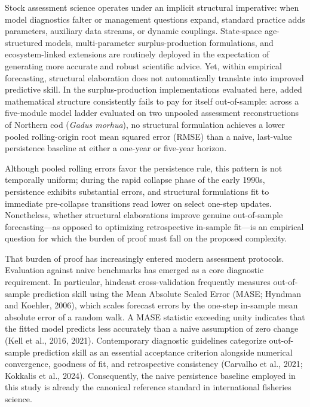 \documentclass[11pt]{article}
\begin{document}
Stock assessment science operates under an implicit structural
imperative: when model diagnostics falter or management questions
expand, standard practice adds parameters, auxiliary data streams, or
dynamic couplings. State-space age-structured models, multi-parameter
surplus-production formulations, and ecosystem-linked extensions are
routinely deployed in the expectation of generating more accurate and
robust scientific advice. Yet, within empirical forecasting, structural
elaboration does not automatically translate into improved predictive
skill. In the surplus-production implementations evaluated here, added
mathematical structure consistently fails to pay for itself
out-of-sample: across a five-module model ladder evaluated on two
unpooled assessment reconstructions of Northern cod (\emph{Gadus
morhua}), no structural formulation achieves a lower pooled
rolling-origin root mean squared error (RMSE) than a naive, last-value
persistence baseline at either a one-year or five-year horizon.

Although pooled rolling errors favor the persistence rule, this pattern
is not temporally uniform; during the rapid collapse phase of the early
1990s, persistence exhibits substantial errors, and structural
formulations fit to immediate pre-collapse transitions read lower on
select one-step updates. Nonetheless, whether structural elaborations
improve genuine out-of-sample forecasting---as opposed to optimizing
retrospective in-sample fit---is an empirical question for which the
burden of proof must fall on the proposed complexity.

That burden of proof has increasingly entered modern assessment
protocols. Evaluation against naive benchmarks has emerged as a core
diagnostic requirement. In particular, hindcast cross-validation
frequently measures out-of-sample prediction skill using the Mean
Absolute Scaled Error (MASE; Hyndman and Koehler, 2006), which scales
forecast errors by the one-step in-sample mean absolute error of a
random walk. A MASE statistic exceeding unity indicates that the fitted
model predicts less accurately than a naive assumption of zero change
(Kell et al., 2016, 2021). Contemporary diagnostic guidelines categorize
out-of-sample prediction skill as an essential acceptance criterion
alongside numerical convergence, goodness of fit, and retrospective
consistency (Carvalho et al., 2021; Kokkalis et al., 2024).
Consequently, the naive persistence baseline employed in this study is
already the canonical reference standard in international fisheries
science.
\end{document}
